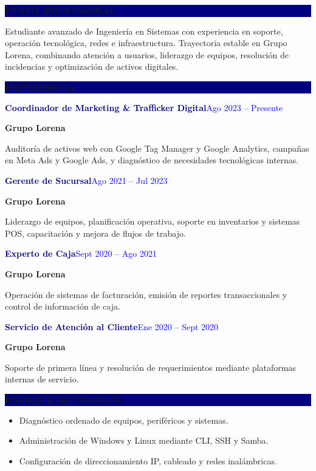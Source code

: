 \documentclass[10pt,a4paper]{article}
\newcommand{\sectionbar}[1]{%
  \vspace{0.45em}\colorbox{Navy}{\parbox{\dimexpr\linewidth-2\fboxsep}{%
  \color{White}\bfseries\MakeUppercase{#1}}}\vspace{0.35em}}
\newcommand{\experience}[4]{%
  \textbf{\textcolor{Navy}{#1}}\hfill\textcolor{Blue}{#2}\par
  \textbf{#3}\par{\small #4}\vspace{0.45em}}
\begin{document}
\begin{minipage}[t]{0.60\textwidth}
  \sectionbar{Perfil profesional}

  Estudiante avanzado de Ingeniería en Sistemas con experiencia en soporte,
  operación tecnológica, redes e infraestructura. Trayectoria estable en
  Grupo Lorena, combinando atención a usuarios, liderazgo de equipos,
  resolución de incidencias y optimización de activos digitales.

  \sectionbar{Experiencia}

  \experience{Coordinador de Marketing \& Trafficker Digital}
  {Ago 2023 -- Presente}{Grupo Lorena}{
    Auditoría de activos web con Google Tag Manager y Google Analytics,
    campañas en Meta Ads y Google Ads, y diagnóstico de necesidades
    tecnológicas internas.}

  \experience{Gerente de Sucursal}
  {Ago 2021 -- Jul 2023}{Grupo Lorena}{
    Liderazgo de equipos, planificación operativa, soporte en inventarios y
    sistemas POS, capacitación y mejora de flujos de trabajo.}

  \experience{Experto de Caja}
  {Sept 2020 -- Ago 2021}{Grupo Lorena}{
    Operación de sistemas de facturación, emisión de reportes transaccionales
    y control de información de caja.}

  \experience{Servicio de Atención al Cliente}
  {Ene 2020 -- Sept 2020}{Grupo Lorena}{
    Soporte de primera línea y resolución de requerimientos mediante
    plataformas internas de servicio.}

  \sectionbar{Enfoque de trabajo}

  \begin{itemize}
    \item Diagnóstico ordenado de equipos, periféricos y sistemas.
    \item Administración de Windows y Linux mediante CLI, SSH y Samba.
    \item Configuración de direccionamiento IP, cableado y redes inalámbricas.
  \end{itemize}
\end{minipage}
\hfill
\end{document}
